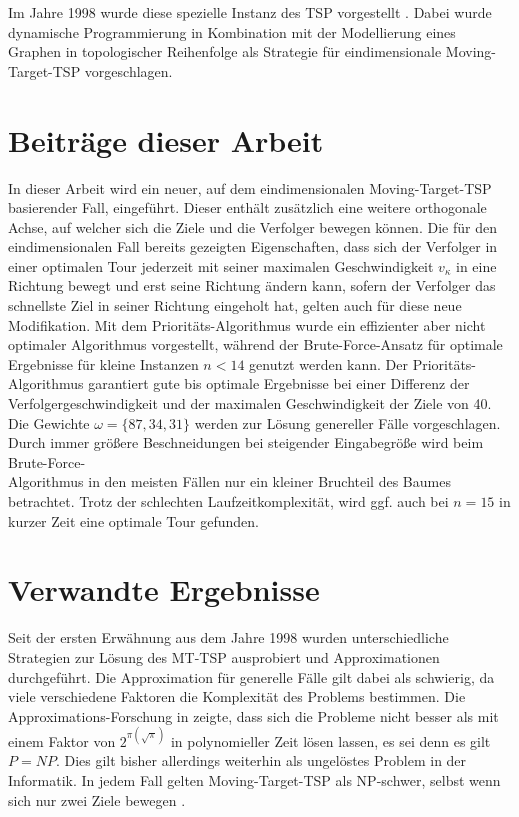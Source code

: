\documentclass[german,version-2019-11]{uzl-thesis}
\begin{document}
Im Jahre 1998 wurde diese spezielle Instanz des TSP vorgestellt \cite{helvig}. Dabei wurde dynamische Programmierung  \cite{kunzi2013einfuhrungskursus} in Kombination mit der Modellierung eines Graphen in topologischer Reihenfolge als Strategie für eindimensionale Moving-Target-TSP vorgeschlagen.

\section{Beiträge dieser Arbeit}

In dieser Arbeit wird ein neuer, auf dem eindimensionalen Moving-Target-TSP basierender Fall, eingeführt. Dieser enthält zusätzlich eine weitere orthogonale Achse, auf welcher sich die Ziele und die Verfolger bewegen können. Die für den eindimensionalen Fall bereits gezeigten Eigenschaften, dass sich der Verfolger in einer optimalen Tour jederzeit mit seiner maximalen Geschwindigkeit $v_{\kappa}$ in eine Richtung bewegt und erst seine Richtung ändern kann, sofern der Verfolger das schnellste Ziel in seiner Richtung eingeholt hat, gelten auch für diese neue Modifikation. Mit dem Prioritäts-Algorithmus wurde ein effizienter aber nicht optimaler Algorithmus vorgestellt, während der Brute-Force-Ansatz für optimale Ergebnisse für kleine Instanzen $n<14$ genutzt werden kann. Der Prioritäts-Algorithmus garantiert gute bis optimale Ergebnisse bei einer Differenz der Verfolgergeschwindigkeit und der maximalen Geschwindigkeit der Ziele von 40. Die Gewichte $\omega=\{87,34,31\}$ werden zur Lösung genereller Fälle vorgeschlagen. Durch immer größere Beschneidungen bei steigender Eingabegröße wird beim Brute-Force-\\Algorithmus in den meisten Fällen nur ein kleiner Bruchteil des Baumes betrachtet. Trotz der schlechten Laufzeitkomplexität, wird ggf. auch bei $n=15$ in kurzer Zeit eine optimale Tour gefunden.


\section{Verwandte Ergebnisse}

Seit der ersten Erwähnung aus dem Jahre 1998 wurden unterschiedliche Strategien zur Lösung des MT-TSP ausprobiert und Approximationen durchgeführt. Die Approximation für generelle Fälle gilt dabei als schwierig, da viele verschiedene Faktoren die Komplexität des Problems bestimmen. Die Approximations-Forschung in \cite{hammar} zeigte, dass sich die Probleme nicht besser als mit einem Faktor von $2^{\pi(\sqrt{\pi})}$ in polynomieller Zeit lösen lassen, es sei denn es gilt $P=NP$. Dies gilt bisher allerdings weiterhin als ungelöstes Problem in der Informatik. In jedem Fall gelten Moving-Target-TSP als NP-schwer, selbst wenn sich nur zwei Ziele bewegen \cite{hammar}.
\end{document}
